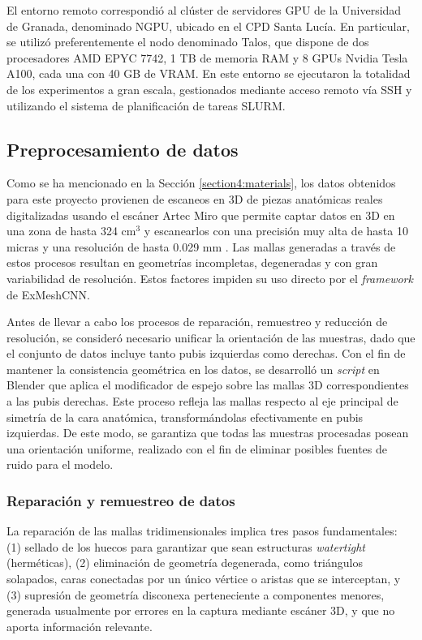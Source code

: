 El entorno remoto correspondió al clúster de servidores GPU de la Universidad de Granada, denominado NGPU, ubicado en el CPD Santa Lucía. En particular, se utilizó preferentemente el nodo denominado Talos, que dispone de dos procesadores AMD EPYC 7742, 1 TB de memoria RAM y 8 GPUs Nvidia Tesla A100, cada una con 40 GB de VRAM. En este entorno se ejecutaron la totalidad de los experimentos a gran escala, gestionados mediante acceso remoto vía SSH y utilizando el sistema de planificación de tareas SLURM.

\subsection{Preprocesamiento de datos}
Como se ha mencionado en la Sección \ref{section4:materials}, los datos obtenidos para este proyecto provienen de escaneos en 3D de piezas anatómicas reales digitalizadas usando el escáner Artec Miro que permite captar datos en 3D en una zona de hasta 324 cm$^3$ y escanearlos con una precisión muy alta de hasta 10 micras y una resolución de hasta 0.029 mm \cite{artec_data}. Las mallas generadas a través de estos procesos resultan en geometrías incompletas, degeneradas y con gran variabilidad de resolución. Estos factores impiden su uso directo por el \textit{framework} de ExMeshCNN.

Antes de llevar a cabo los procesos de reparación, remuestreo y reducción de resolución, se consideró necesario unificar la orientación de las muestras, dado que el conjunto de datos incluye tanto pubis izquierdas como derechas. Con el fin de mantener la consistencia geométrica en los datos, se desarrolló un \textit{script} en Blender que aplica el modificador de espejo sobre las mallas 3D correspondientes a las pubis derechas. Este proceso refleja las mallas respecto al eje principal de simetría de la cara anatómica, transformándolas efectivamente en pubis izquierdas. De este modo, se garantiza que todas las muestras procesadas posean una orientación uniforme, realizado con el fin de eliminar posibles fuentes de ruido para el modelo.

\subsubsection{Reparación y remuestreo de datos}
\label{section4:data_repair}

La reparación de las mallas tridimensionales implica tres pasos fundamentales: (1) sellado de los huecos para garantizar que sean estructuras \textit{watertight} (herméticas), (2) eliminación de geometría degenerada, como triángulos solapados, caras conectadas por un único vértice o aristas que se interceptan, y (3) supresión de geometría disconexa perteneciente a componentes menores, generada usualmente por errores en la captura mediante escáner 3D, y que no aporta información relevante.

